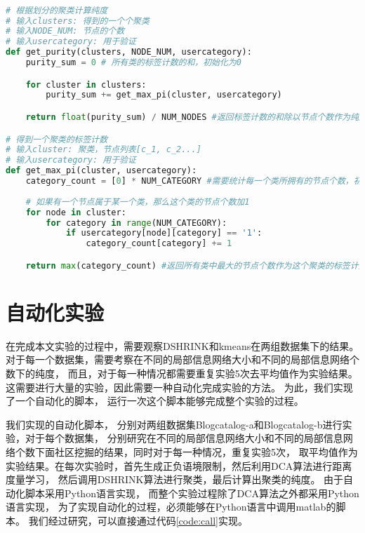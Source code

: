 \begin{lstlisting}[language={python}, caption={计算聚类的纯度}, label=code:purity]

# 根据划分的聚类计算纯度
# 输入clusters: 得到的一个个聚类
# 输入NODE_NUM: 节点的个数
# 输入usercategory: 用于验证
def get_purity(clusters, NODE_NUM, usercategory):
    purity_sum = 0 # 所有类的标签计数的和，初始化为0

    for cluster in clusters:
        purity_sum += get_max_pi(cluster, usercategory)

    return float(purity_sum) / NUM_NODES #返回标签计数的和除以节点个数作为纯度

# 得到一个聚类的标签计数
# 输入cluster: 聚类，节点列表[c_1, c_2...] 
# 输入usercategory: 用于验证
def get_max_pi(cluster, usercategory):
    category_count = [0] * NUM_CATEGORY #需要统计每一个类所拥有的节点个数，初始化都为0
    
    # 如果有一个节点属于某一个类，那么这个类的节点个数加1
    for node in cluster:
        for category in range(NUM_CATEGORY):
            if usercategory[node][category] == '1':
                category_count[category] += 1

    return max(category_count) #返回所有类中最大的节点个数作为这个聚类的标签计数

\end{lstlisting}


\section{自动化实验}

在完成本文实验的过程中，需要观察DSHRINK和kmeans在两组数据集下的结果。
对于每一个数据集，需要考察在不同的局部信息网络大小和不同的局部信息网络个数下的纯度，
而且，对于每一种情况都需要重复实验5次去平均值作为实验结果。
这需要进行大量的实验，因此需要一种自动化完成实验的方法。
为此，我们实现了一个自动化的脚本，
运行一次这个脚本能够完成整个实验的过程。

我们实现的自动化脚本，
分别对两组数据集Blogcatalog-a和Blogcatalog-b进行实验，对于每个数据集，
分别研究在不同的局部信息网络大小和不同的局部信息网络个数下面社区挖掘的结果，同时对于每一种情况，重复实验5次，
取平均值作为实验结果。在每次实验时，首先生成正负语境限制，然后利用DCA算法进行距离度量学习，
然后调用DSHRINK算法进行聚类，最后计算出聚类的纯度。
由于自动化脚本采用Python语言实现，
而整个实验过程除了DCA算法之外都采用Python语言实现，
为了实现自动化的过程，必须能够在Python语言中调用matlab的脚本。
我们经过研究，可以直接通过代码\ref{code:call}实现。

